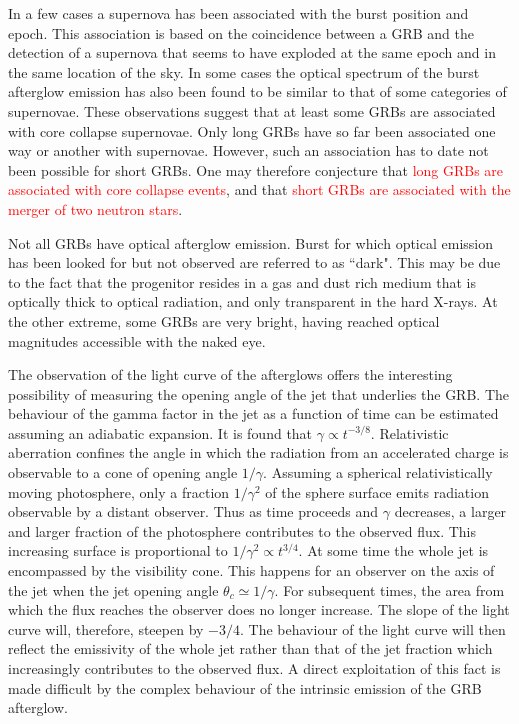 \documentclass[12pt,a4paper]{article}
\begin{document}
In a few cases a supernova has been associated with the burst position and epoch. This association is based on the coincidence between a GRB and the detection of a supernova that seems to have exploded at the same epoch and in the same location of the sky. In some cases the optical spectrum of the burst afterglow emission has also been found to be similar to that of some categories of supernovae. These observations suggest that at least some GRBs are associated with core collapse supernovae. Only long GRBs have so far been associated one way or another with supernovae. However, such an association has to date not been possible for short GRBs. One may therefore conjecture that \textcolor{red}{long GRBs are associated with core collapse events}, and that \textcolor{red}{short GRBs are associated with the merger of two neutron stars}. 

Not all GRBs have optical afterglow emission. Burst for which optical emission has been looked for but not observed are referred to as ``dark". This may be due to the fact that the progenitor resides in a gas and dust rich medium that is optically thick to optical radiation, and only transparent in the hard X-rays. At the other extreme, some GRBs are very bright, having reached optical magnitudes accessible with the naked eye.

The observation of the light curve of the afterglows offers the interesting possibility of measuring the opening angle of the jet that underlies the GRB. The behaviour of the gamma factor in the jet as a function of time can be estimated assuming an adiabatic expansion. It is found that $\gamma \propto t^{-3/8}$. Relativistic aberration confines the angle in which the radiation from an accelerated charge is observable to a cone of opening angle $1/\gamma$. Assuming a spherical relativistically moving photosphere, only a fraction $1/\gamma^2$ of the sphere surface emits radiation observable by a distant observer. Thus as time proceeds and $\gamma$ decreases, a larger and larger fraction of the photosphere contributes to the observed flux. This increasing surface is proportional to $1/\gamma^2 \propto t^{3/4}$. At some time the whole jet is encompassed by the visibility cone. This happens for an observer on the axis of the jet when the jet opening angle $\theta_c \simeq 1/\gamma$. For subsequent times, the area from which the flux reaches the observer does no longer increase. The slope of the light curve will, therefore, steepen by $-3/4$. The behaviour of the light curve will then reflect the emissivity of the whole jet rather than that of the jet fraction which increasingly contributes to the observed flux. A direct exploitation of this fact is made difficult by the complex behaviour of the intrinsic emission of the GRB afterglow. 
\end{document}
